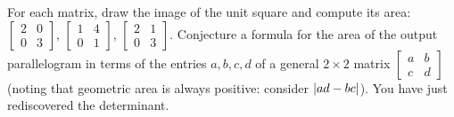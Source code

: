 \begin{exercise}
\label{ch05:ex-area}
For each matrix, draw the image of the unit square and compute its area:
$\begin{bmatrix} 2 & 0 \\ 0 & 3\end{bmatrix}$,
$\begin{bmatrix} 1 & 4 \\ 0 & 1\end{bmatrix}$,
$\begin{bmatrix} 2 & 1 \\ 0 & 3\end{bmatrix}$.
Conjecture a formula for the area of the output parallelogram in terms of the
entries $a,b,c,d$ of a general $2\times 2$ matrix $\begin{bmatrix} a & b \\ c & d\end{bmatrix}$
(noting that geometric area is always positive: consider $\lvert ad - bc\rvert$).
You have just rediscovered the determinant.
\end{exercise}
